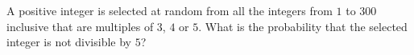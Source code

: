 A positive integer is selected at random from all the integers from $1$ to $300$ inclusive that are multiples of $3$, $4$ or $5$. What is the probability that the selected integer is not divisible by $5$?
